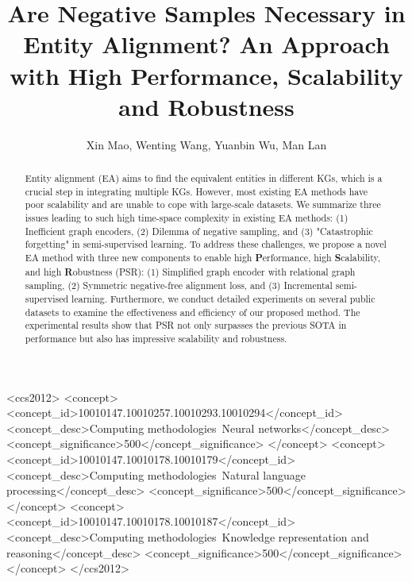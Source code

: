 \documentclass[sigconf]{acmart}
\begin{document}
\title{Are Negative Samples Necessary in Entity Alignment? An Approach with High Performance, Scalability and Robustness}

\author{Xin Mao, Wenting Wang, Yuanbin Wu, Man Lan}


\begin{abstract}
Entity alignment (EA) aims to find the equivalent entities in different KGs, which is a crucial step in integrating multiple KGs.
However, most existing EA methods have poor scalability and are unable to cope with large-scale datasets.
We summarize three issues leading to such high time-space complexity in existing EA methods:
(1) Inefficient graph encoders, (2) Dilemma of negative sampling, and (3) "Catastrophic forgetting" in semi-supervised learning.
To address these challenges, we propose a novel EA method with three new components to enable high \textbf{P}erformance, high \textbf{S}calability, and high \textbf{R}obustness (PSR):
(1) Simplified graph encoder with relational graph sampling, (2) Symmetric negative-free alignment loss,
and (3) Incremental semi-supervised learning.
Furthermore, we conduct detailed experiments on several public datasets to examine the effectiveness and efficiency of our proposed method.
The experimental results show that PSR not only surpasses the previous SOTA in performance but also has impressive scalability and robustness.
\end{abstract}

\begin{CCSXML}
<ccs2012>
<concept>
<concept_id>10010147.10010257.10010293.10010294</concept_id>
<concept_desc>Computing methodologies~Neural networks</concept_desc>
<concept_significance>500</concept_significance>
</concept>
<concept>
<concept_id>10010147.10010178.10010179</concept_id>
<concept_desc>Computing methodologies~Natural language processing</concept_desc>
<concept_significance>500</concept_significance>
</concept>
<concept>
<concept_id>10010147.10010178.10010187</concept_id>
<concept_desc>Computing methodologies~Knowledge representation and reasoning</concept_desc>
<concept_significance>500</concept_significance>
</concept>
</ccs2012>
\end{CCSXML}

\end{document}

